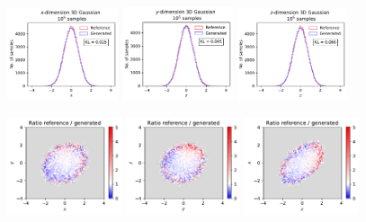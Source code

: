 \documentclass[twocolumn,preprintnumbers,superscriptaddress]{revtex4-2}
\begin{document}
\begin{figure}
 
  \includegraphics[width=0.29\textwidth]{plots/3Dgaussian_posdef/1-distribution_3dgaussian_100k.pdf}%
  \includegraphics[width=0.29\textwidth]{plots/3Dgaussian_posdef/2-distribution_3dgaussian_100k.pdf}%
  \includegraphics[width=0.29\textwidth]{plots/3Dgaussian_posdef/3-distribution_3dgaussian_100k.pdf}
  
   \includegraphics[width=0.3\textwidth]{plots/3Dgaussian_posdef/1-2_RATIO_100k.pdf}%
  \includegraphics[width=0.3\textwidth]{plots/3Dgaussian_posdef/2-3_RATIO_100k.pdf}%
  \includegraphics[width=0.3\textwidth]{plots/3Dgaussian_posdef/3-1_RATIO_100k.pdf}



\end{figure}
\end{document}
